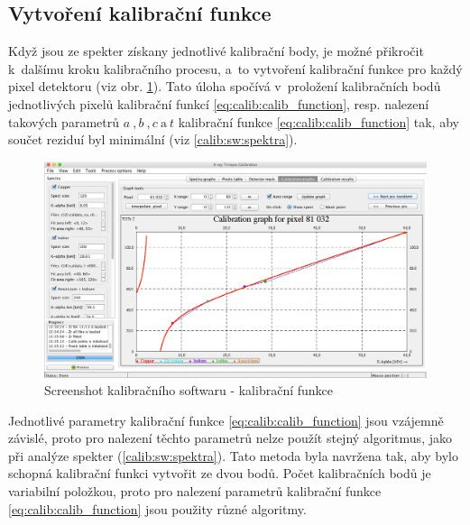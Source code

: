 \subsection{Vytvoření kalibrační funkce}
Když jsou ze spekter získany jednotlivé kalibrační body, je možné přikročit k~dalšímu kroku kalibračního procesu, a~to vytvoření kalibrační funkce pro každý pixel detektoru (viz obr. \ref{fig:calib:sw_calib_function}). Tato úloha spočívá v~proložení kalibračních bodů jednotlivých pixelů kalibrační funkcí \ref{eq:calib:calib_function}, resp. nalezení takových parametrů $a~,b~,c~\text{a}~t$ kalibrační funkce \ref{eq:calib:calib_function} tak, aby součet reziduí byl minimální (viz \ref{calib:sw:spektra}).

\begin{figure}[t]
	\begin{center}
		\includegraphics[width=15cm]{figures/calibsw_cc.png}
		\caption{Screenshot kalibračního softwaru - kalibrační funkce}
		\label{fig:calib:sw_calib_function}
	\end{center}
\end{figure}

Jednotlivé parametry kalibrační funkce \ref{eq:calib:calib_function} jsou vzájemně závislé, proto pro nalezení těchto parametrů nelze použít stejný algoritmus, jako při analýze spekter (\ref{calib:sw:spektra}). Tato metoda byla navržena tak, aby bylo schopná kalibrační funkci vytvořit ze dvou bodů. Počet kalibračních bodů je variabilní položkou, proto pro nalezení parametrů kalibrační funkce \ref{eq:calib:calib_function} jsou použity různé algoritmy.

